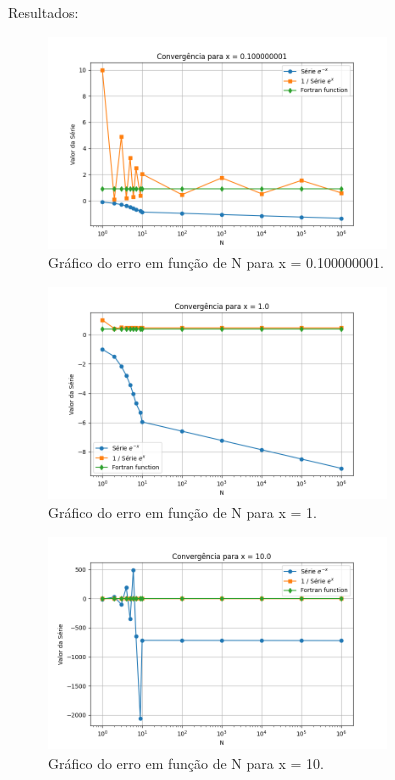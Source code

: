 \documentclass[12pt, a4paper]{article} %
\begin{document}
    Resultados:
    \begin{figure}[H]
        \centering
        \includegraphics[width=0.8\textwidth]{../images/grafico_x_0.100000001.png}
        \caption{Gr\'afico do erro em fun\c{c}\~ao de N para x = 0.100000001.}
    \end{figure}

    \begin{figure}[H]
        \centering
        \includegraphics[width=0.8\textwidth]{../images/grafico_x_1.0.png}
        \caption{Gr\'afico do erro em fun\c{c}\~ao de N para x = 1.}
    \end{figure}

    \begin{figure}[H]
        \centering
        \includegraphics[width=0.8\textwidth]{../images/grafico_x_10.0.png}
        \caption{Gr\'afico do erro em fun\c{c}\~ao de N para x = 10.}
    \end{figure}
\end{document}
